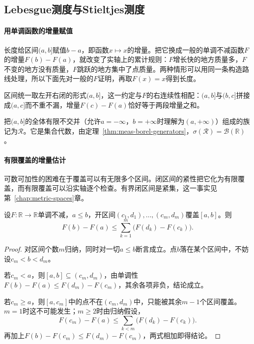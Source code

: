 \subsection{Lebesgue测度与Stieltjes测度}
\label{sec:meas-lebesgue-stieltjes}

\paragraph{用单调函数的增量赋值}
长度给区间$(a,b]$赋值$b-a$，即函数$x\mapsto x$的增量。把它换成一般的单调不减函数$F$的增量$F(b)-F(a)$，就改变了实轴上的累计规则：$F$增长快的地方质量多，$F$不变的地方没有质量，$F$跳跃的地方集中了点质量。两种情形可以用同一条构造路线处理，所以下面先对一般的$F$证明，再取$F(x)=x$得到长度。

区间统一取左开右闭的形式$(a,b]$，这一约定与$F$的右连续性相配：$(a,b]$与$(b,c]$拼接成$(a,c]$而不重不漏，增量$F(c)-F(a)$恰好等于两段增量之和。

把$(a,b]$的全体有限不交并（允许$a=-\infty$，$b=+\infty$时理解为$(a,+\infty)$）组成的族记为$\mathcal R$。它是集合代数，由定理~\ref{thm:meas-borel-generators}，$\sigma(\mathcal R)=\mathcal B(\mathbb R)$。

\paragraph{有限覆盖的增量估计}
可数可加性的困难在于覆盖可以有无限多个区间。闭区间的紧性把它化为有限覆盖，而有限覆盖可以沿实轴逐个检查。有界闭区间是紧集，这一事实见第~\ref{chap:metric-spaces}章。

\begin{lemma}[闭区间的有限开覆盖]
\label{lem:meas-finite-cover}
设$F:\mathbb R\to\mathbb R$单调不减，$a\leq b$，开区间$(c_1,d_1),\dots,(c_m,d_m)$覆盖$[a,b]$。则
\begin{equation}
 F(b)-F(a)\leq\sum_{k=1}^m\bigl(F(d_k)-F(c_k)\bigr).
 \label{eq:meas-finite-cover}
\end{equation}
\end{lemma}

\begin{proof}
对区间个数$m$归纳，同时对一切$a\leq b$断言成立。点$b$落在某个区间中，不妨设$c_m<b<d_m$。

若$c_m<a$，则$[a,b]\subseteq(c_m,d_m)$，由单调性$F(b)-F(a)\leq F(d_m)-F(c_m)$，其余各项非负，结论成立。

若$c_m\geq a$，则$[a,c_m]$中的点不在$(c_m,d_m)$中，只能被其余$m-1$个区间覆盖。$m=1$时这不可能发生；$m\geq2$时由归纳假设，
\[
 F(c_m)-F(a)\leq\sum_{k<m}\bigl(F(d_k)-F(c_k)\bigr).
\]
再加上$F(b)-F(c_m)\leq F(d_m)-F(c_m)$，两式相加即得结论。
\end{proof}

